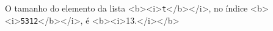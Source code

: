 \documentclass[12pt,varwidth=16cm,border=1pt]{standalone}
\begin{document}
 
 
O tamanho do elemento da lista <b><i>\verb+t+</b></i>, no índice <b><i>\verb+5312+</b></i>, é <b><i>13.</i></b> 
 
\questiomtrue 
 
\end{document}
